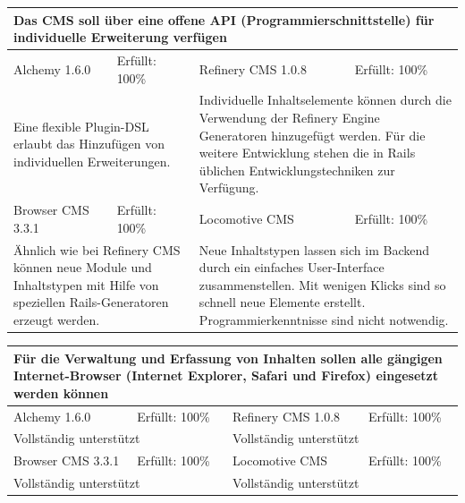 \begin{tabular}[!ht]{|l|l|l|l|}
\hline
\multicolumn{4}{|p{15cm}|}{\textbf{Das CMS soll über eine offene API (Programmierschnittstelle) für individuelle Erweiterung verfügen}} \\
\hline
  Alchemy 1.6.0 & \cellcolor{green}Erfüllt: 100\% & Refinery CMS 1.0.8 & \cellcolor{green}Erfüllt: 100\% \\
  \hline
  \multicolumn{2}{|p{7.5cm}|}{Eine flexible Plugin-DSL erlaubt das Hinzufügen von individuellen Erweiterungen.}
   & \multicolumn{2}{p{7.5cm}|}{Individuelle Inhaltselemente können durch die Verwendung der Refinery Engine Generatoren hinzugefügt werden. Für die weitere Entwicklung stehen die in Rails üblichen Entwicklungstechniken zur Verfügung.} \\
  \hline
  Browser CMS 3.3.1 & \cellcolor{green}Erfüllt: 100\% & Locomotive CMS & \cellcolor{green}Erfüllt: 100\% \\
  \hline
  \multicolumn{2}{|p{7.5cm}|}{Ähnlich wie bei Refinery CMS können neue Module und Inhaltstypen mit Hilfe von speziellen Rails-Generatoren erzeugt werden.} & \multicolumn{2}{p{7.5cm}|}{Neue Inhaltstypen lassen sich im Backend durch ein einfaches User-Interface zusammenstellen.  Mit wenigen Klicks sind so schnell neue Elemente erstellt. Programmierkenntnisse sind nicht notwendig.} \\
\hline
\end{tabular}
\newline
\newline
\newline
\begin{tabular}[!ht]{|l|l|l|l|}
\hline
\multicolumn{4}{|p{15cm}|}{\textbf{Für die Verwaltung und Erfassung von Inhalten sollen alle gängigen Internet-Browser (Internet Explorer, Safari und Firefox) eingesetzt werden können}} \\
\hline
  Alchemy 1.6.0 & \cellcolor{green}Erfüllt: 100\% & Refinery CMS 1.0.8 & \cellcolor{green}Erfüllt: 100\% \\
  \hline
  \multicolumn{2}{|p{7.5cm}|}{Vollständig unterstützt}
   & \multicolumn{2}{p{7.5cm}|}{Vollständig unterstützt} \\
  \hline
  Browser CMS 3.3.1 & \cellcolor{green}Erfüllt: 100\% & Locomotive CMS & \cellcolor{green}Erfüllt: 100\% \\
  \hline
  \multicolumn{2}{|p{7.5cm}|}{Vollständig unterstützt} & \multicolumn{2}{p{7.5cm}|}{Vollständig unterstützt} \\
\hline
\end{tabular}
